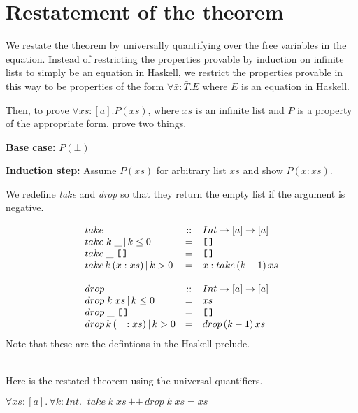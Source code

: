 \documentclass[11pt]{article}
\newcommand{\append}{\,{\texttt{++}}\,}
\newcommand{\nil}{{\texttt{[{\hspace{.125em}}]}}}
\begin{document}
\section{Restatement of the theorem}

We restate the theorem by universally quantifying over the free variables in
the equation.  Instead of restricting the properties provable by induction on
infinite lists to simply be an equation in Haskell, we restrict the properties
provable in this way to be properties of the form $\forall{}\bar{x}:\bar{T}.E$
where $E$ is an equation in Haskell.

 Then, to prove $\forall{}xs:[a].P(xs)$, where $xs$ is an infinite list and $P$ is a property of the appropriate form, prove two things.
\begin{description}
\item{{\bf{Base case:}}} $P(\bot)$
\item{{\bf{Induction step:}}} Assume $P(xs)$ for arbitrary list $xs$ and show
$P(x:xs)$.

\end{description} 



We redefine {\it{take}} and {\it{drop}} so that they return the empty list if
the argument is negative.

\[\begin{array}{lcl}
 take &  :: & Int \rightarrow [a] \rightarrow [a] \\
 take\; k\; \_ \, |\, k \le 0 & = &  \nil \\
 take\; \_ \;\nil & = &  \nil \\
 take\, k\, (x:xs)\, |\, k > 0 & = &  x:take\, (k-1)\, xs \\
\ \\
 drop &  :: & Int \rightarrow [a] \rightarrow [a] \\
 drop\; k\; xs \,|\, k \le 0  & = &  xs \\
 drop\; \_ \;\nil & = &  \nil \\
 drop\, k\, (\_:xs)\, |\, k > 0 & = &  drop\, (k-1)\, xs \\

\end{array}\]
Note that these are the defintions in the Haskell prelude.

\ \\

Here is the restated theorem using the universal quantifiers.

\begin{theorem}
$\forall{}xs:[a].\,\forall{}k:Int.\;\;take\; k\; xs \append drop\; k\; xs = xs$
\end{theorem}





\end{document}
